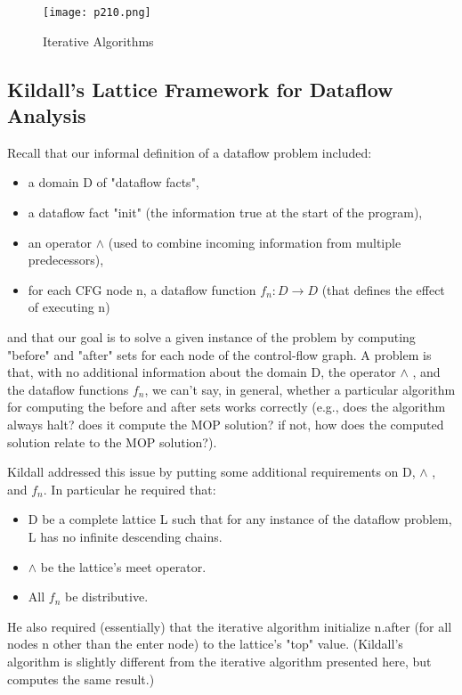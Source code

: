 \begin{figure}[H]
	\centering
	\texttt{[image: p210.png]}
	\caption{Iterative Algorithms}
	\label{fig:p210}
\end{figure}




\subsection{Kildall's Lattice Framework for Dataflow Analysis}


Recall that our informal definition of a dataflow problem included:
\begin{itemize}
	\item a domain D of "dataflow facts",
	\item a dataflow fact "init" (the information true at the start
	      of the program),
	\item an operator $\wedge$ (used to combine incoming information from multiple predecessors),
	\item for each CFG node n, a dataflow function
	      $f_n : D \rightarrow D$ (that defines the effect of executing n)

\end{itemize}

and that our goal is to solve a given instance of the problem by computing
"before" and "after" sets for each node of the control-flow graph.
A problem is that, with no additional information about the domain D,
the operator $\wedge$ , and the dataflow functions $f_n$, we can't say,
in general, whether a particular algorithm for computing the before
and after sets works correctly (e.g., does the algorithm always halt?
does it compute the MOP solution? if not, how does the computed solution
relate to the MOP solution?).


Kildall addressed this issue by putting some additional requirements
on D, $\wedge$ , and $f_n$. In particular he required that:


\begin{itemize}
	\item  D be a complete lattice L such that for any instance of the dataflow problem, L has no infinite descending chains.
	\item  $\wedge$ be the lattice's meet operator.
	\item  All $f_n$ be distributive.
\end{itemize}
He also required (essentially) that the iterative algorithm initialize n.after (for all nodes n other than the enter node) to the lattice's "top" value. (Kildall's algorithm is slightly different from the iterative algorithm presented here, but computes the same result.)

